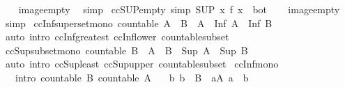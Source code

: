 \begin{isabellebody}
%
\isadelimproof
\ \ %
\endisadelimproof
%
\isatagproof
{}\isamarkupfalse%
\ image{\isacharunderscore}empty\ \isamarkupfalse%
\ simp%
\endisatagproof
{\isafoldproof}%
%
\isadelimproof
\isanewline
%
\endisadelimproof
\isanewline
{}\isamarkupfalse%
\ ccSUP{\isacharunderscore}empty\ {\isacharbrackleft}simp{\isacharbrackright}{\isacharcolon}\ {\isachardoublequoteopen}{\isacharparenleft}SUP\ x{\isasymin}{\isacharbraceleft}{\isacharbraceright}{\isachardot}\ f\ x{\isacharparenright}\ {\isacharequal}\ bot{\isachardoublequoteclose}\isanewline
%
\isadelimproof
\ \ %
\endisadelimproof
%
\isatagproof
{}\isamarkupfalse%
\ image{\isacharunderscore}empty\ \isamarkupfalse%
\ simp%
\endisatagproof
{\isafoldproof}%
%
\isadelimproof
\isanewline
%
\endisadelimproof
\isanewline
{}\isamarkupfalse%
\ ccInf{\isacharunderscore}superset{\isacharunderscore}mono{\isacharcolon}\ {\isachardoublequoteopen}countable\ A\ {\isasymLongrightarrow}\ B\ {\isasymsubseteq}\ A\ {\isasymLongrightarrow}\ Inf\ A\ {\isasymle}\ Inf\ B{\isachardoublequoteclose}\isanewline
%
\isadelimproof
\ \ %
\endisadelimproof
%
\isatagproof
{}\isamarkupfalse%
\ {\isacharparenleft}auto\ intro{\isacharcolon}\ ccInf{\isacharunderscore}greatest\ ccInf{\isacharunderscore}lower\ countable{\isacharunderscore}subset{\isacharparenright}%
\endisatagproof
{\isafoldproof}%
%
\isadelimproof
\isanewline
%
\endisadelimproof
\isanewline
{}\isamarkupfalse%
\ ccSup{\isacharunderscore}subset{\isacharunderscore}mono{\isacharcolon}\ {\isachardoublequoteopen}countable\ B\ {\isasymLongrightarrow}\ A\ {\isasymsubseteq}\ B\ {\isasymLongrightarrow}\ Sup\ A\ {\isasymle}\ Sup\ B{\isachardoublequoteclose}\isanewline
%
\isadelimproof
\ \ %
\endisadelimproof
%
\isatagproof
{}\isamarkupfalse%
\ {\isacharparenleft}auto\ intro{\isacharcolon}\ ccSup{\isacharunderscore}least\ ccSup{\isacharunderscore}upper\ countable{\isacharunderscore}subset{\isacharparenright}%
\endisatagproof
{\isafoldproof}%
%
\isadelimproof
\isanewline
%
\endisadelimproof
\isanewline
{}\isamarkupfalse%
\ ccInf{\isacharunderscore}mono{\isacharcolon}\isanewline
\ \ \ {\isacharbrackleft}intro{\isacharbrackright}{\isacharcolon}\ {\isachardoublequoteopen}countable\ B{\isachardoublequoteclose}\ {\isachardoublequoteopen}countable\ A{\isachardoublequoteclose}\isanewline
\ \ \ {\isachardoublequoteopen}{\isasymAnd}b{\isachardot}\ b\ {\isasymin}\ B\ {\isasymLongrightarrow}\ {\isasymexists}a{\isasymin}A{\isachardot}\ a\ {\isasymle}\ b{\isachardoublequoteclose}\isanewline

\end{isabellebody}
